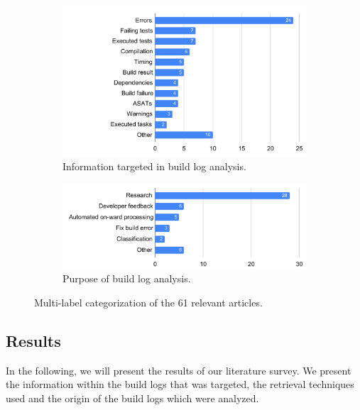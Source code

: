 \begin{figure}
\centering
\begin{subfigure}[t]{\columnwidth}
		\centering
		\includegraphics[width=\columnwidth,
		clip]{img/lit-sur/info_target.pdf}
		\caption{Information targeted in build log analysis.}
		\label{fig:litsur:info_target}

\end{subfigure}\hspace{\fill}
\begin{subfigure}[t]{\columnwidth}
		\centering
				\includegraphics[width=\columnwidth,
				clip]{img/lit-sur/use.pdf}
		\caption{Purpose of build log analysis.}
		\label{fig:litsur:use}

\end{subfigure}

\caption{Multi-label categorization of the 61 relevant articles.}
\end{figure}

\subsection{Results}
In the following, we will present the results of our literature survey.
We present the information within the build logs that was targeted,
the retrieval techniques used and the origin of the build logs
which were analyzed.

